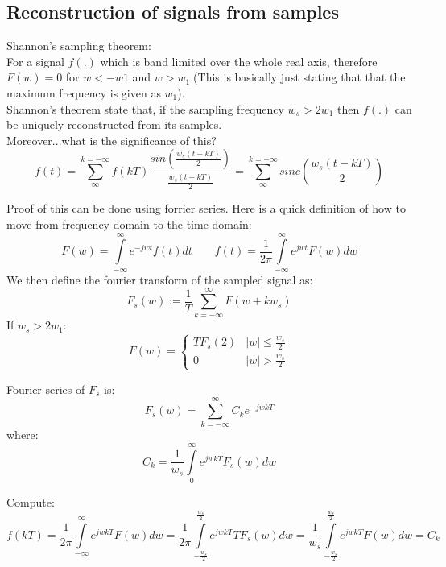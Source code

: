\documentclass[a4paper,11pt]{article}
\begin{document}
\subsection{Reconstruction of signals from samples}
	Shannon's sampling theorem:\\
	For a signal $f(.)$ which is band limited over the whole real axis, therefore $F(w)=0$ for $w<-w1$ and $w>w_1$.(This is basically just stating that that the maximum frequency is given as $w_1$).\\
	Shannon's theorem state that, if the sampling frequency $ w_s > 2 w_1$ then $f(.)$ can be uniquely reconstructed from its samples.\\
	Moreover...what is the significance of this?
	\begin{equation}
		f(t)=\sum\limits_{\infty}^{k=-\infty}f(kT)\frac{sin(\frac{w_s(t-kT)}{2})}{\frac{w_s(t-kT)}{2}}= \sum\limits_{\infty}^{k=-\infty}sinc(\frac{w_s(t-kT)}{2})
	\end{equation}
	
	Proof of this can be done using forrier series. Here is a quick definition of how to move from frequency domain to the time domain:
	\begin{equation}
		F(w)=\int\limits_{-\infty}^{\infty}e^{-jwt}f(t)dt
	    	\qquad
	    	f(t)=\frac{1}{2\pi}\int\limits_{-\infty}^{\infty}e^{jwt}F(w)dw
	\end{equation}	
	We then define the fourier transform of the sampled signal as:
	\begin{equation}
		F_s(w):=\frac{1}{T}\sum\limits_{k=-\infty}^{\infty}F(w+kw_s)
	\end{equation}	
	If $w_s>2w_1$:
				\[ F(w) =\begin{cases} 
      			TF_s(2) & |w|\leq \frac{w_s}{2}\\
      			0 & |w| >\frac{w_s}{2} 			
   			\end{cases}
			\]
	
	Fourier series of $F_s$ is: 
	\begin{equation}
	    F_s(w) = \sum\limits_{k=-\infty}^{\infty}C_ke^{-jwkT}
	\end{equation}
	where: 
	 \begin{equation}
	    C_k=\frac{1}{w_s} \int\limits_{0}^{\infty}e^{jwkT}F_s(w)dw
	\end{equation}
	
	
	Compute:
	 \begin{equation}
	    f(kT)=\frac{1}{2\pi}\int\limits_{-\infty}^{\infty}e^{jwkT}F(w)dw=\frac{1}{2\pi}\int\limits_{-\frac{w_s}{2}}^{\frac{w_s}{2}}e^{jwkT}TF_s(w)dw=\frac{1}{w_s}\int\limits_{-\frac{w_s}{2}}^{\frac{w_s}{2}}e^{jwkT}F(w)dw= C_k
	\end{equation}
		
\end{document}
